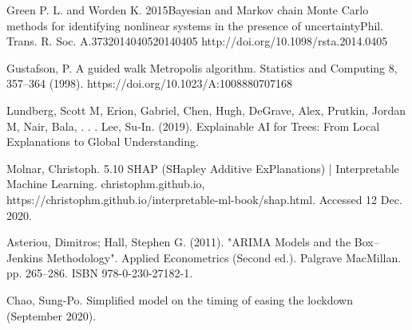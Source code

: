 \documentclass{article}
\begin{document}

\begin{thebibliography}{9}

Green P. L. and Worden K. 2015Bayesian and Markov chain Monte Carlo methods for identifying nonlinear systems in the presence of uncertaintyPhil. Trans. R. Soc. A.3732014040520140405 http://doi.org/10.1098/rsta.2014.0405

Gustafson, P. A guided walk Metropolis algorithm. Statistics and Computing 8, 357–364 (1998). https://doi.org/10.1023/A:1008880707168

Lundberg, Scott M, Erion, Gabriel, Chen, Hugh, DeGrave, Alex, Prutkin, Jordan M, Nair, Bala, . . . Lee, Su-In. (2019). Explainable AI for Trees: From Local Explanations to Global Understanding.

Molnar, Christoph. 5.10 SHAP (SHapley Additive ExPlanations) | Interpretable Machine Learning. christophm.github.io, https://christophm.github.io/interpretable-ml-book/shap.html. Accessed 12 Dec. 2020.


Asteriou, Dimitros; Hall, Stephen G. (2011). "ARIMA Models and the Box–Jenkins Methodology". Applied Econometrics (Second ed.). Palgrave MacMillan. pp. 265–286. ISBN 978-0-230-27182-1.

Chao, Sung-Po. Simplified model on the timing of easing the lockdown (September 2020). 

\end{thebibliography}
\end{document}
